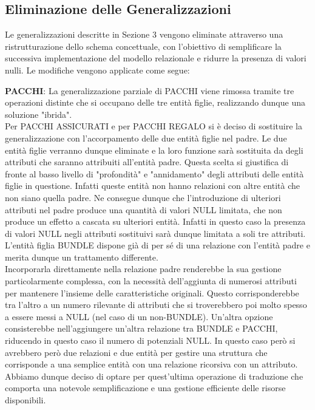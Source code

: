 \subsection{Eliminazione delle Generalizzazioni}

Le generalizzazioni descritte in Sezione 3 vengono eliminate attraverso una ristrutturazione dello schema concettuale, con l’obiettivo di semplificare la successiva implementazione del modello relazionale e ridurre la presenza di valori nulli. Le modifiche
vengono applicate come segue:

\textbf{PACCHI}: La generalizzazione parziale di PACCHI viene rimossa tramite tre operazioni distinte che si occupano delle tre entità figlie, realizzando dunque una soluzione "ibrida".\\
Per PACCHI ASSICURATI e per PACCHI REGALO si è deciso di sostituire la generalizzazione con l'accorpamento delle due entità figlie nel padre. Le due entità figlie verranno dunque eliminate e la loro funzione sarà sostituita da degli attributi che saranno attribuiti all'entità padre. Questa scelta si giustifica di fronte al basso livello di "profondità" e "annidamento" degli attributi delle entità figlie in questione. Infatti queste entità non hanno relazioni con altre entità che non siano quella padre. Ne consegue dunque che l'introduzione di ulteriori attributi nel padre produce una quantità di valori NULL limitata, che non produce un effetto a cascata su ulteriori entità. Infatti in questo caso la presenza di valori NULL negli attributi sostituivi sarà dunque limitata a soli tre attributi.\\
L'entità figlia BUNDLE dispone già di per sé di una relazione con l'entità padre e merita dunque un trattamento differente.\\
Incorporarla direttamente nella relazione padre renderebbe la sua gestione particolarmente complessa, con la necessità dell'aggiunta di numerosi attributi per mantenere l'insieme delle caratteristiche originali. Questo corrisponderebbe tra l'altro a un numero rilevante di attributi che si troverebbero poi molto spesso a essere messi a NULL (nel caso di un non-BUNDLE). 
Un'altra opzione consisterebbe  nell'aggiungere un'altra relazione tra BUNDLE e PACCHI, riducendo in questo caso il numero di potenziali NULL. In questo caso però si avrebbero però due relazioni e due entità per gestire una struttura che corrisponde a una semplice entità con una relazione ricorsiva con un attributo. Abbiamo dunque deciso di optare per quest'ultima operazione di traduzione che comporta una notevole semplificazione e una gestione efficiente delle risorse disponibili.

